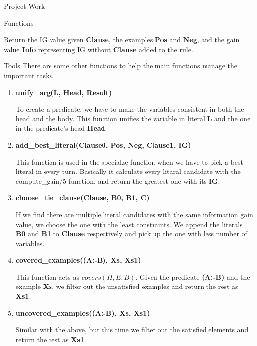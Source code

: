 \documentclass[12pt,a4paper]{article}
\begin{document}
\begin{section}{Project Work}
\begin{subsection}{Functions}
\begin{enumerate}
{					Return the IG value given {\bf Clause}, the examples {\bf Pos} and {\bf Neg}, and the gain value {\bf Info} representing IG without {\bf Clause} added to the rule.
				}
			\end{enumerate}
		\end{subsection}
		\begin{subsection}{Tools}
		There are some other functions to help the main functions manage the important tasks.
		\begin{enumerate}
			\item {
				{\bf unify\_arg(L, Head, Result)}

				To create a predicate, we have to make the variables consistent in both the head and the body. This function unifies the variable in literal {\bf L} and the one in the predicate's head {\bf Head}.
			}
			\item {
				{\bf add\_best\_literal(Clause0, Pos, Neg, Clause1, IG)}

				This function is used in the specialze function when we have to pick a best literal in every turn. Basically it calculate every litaral candidate with the compute\_gain/5 function, and return the greatest one with its {\bf IG}.
			}
			\item {
				{\bf choose\_tie\_clause(Clause, B0, B1, C)}

				If we find there are multiple literal candidates with the same information gain value, we choose the one with the least constraints. We append the literals {\bf B0} and {\bf B1} to {\bf Clause} respectively and pick up the one with less number of variables.
			}
			\item {
				{\bf covered\_examples((A:-B), Xs, Xs1)}

				This function acts as $covers(H,E,B)$. Given the predicate {\bf (A:-B)} and the example {\bf Xs}, we filter out the unsatisfied examples and return the rest as {\bf Xs1}.
			}
			\item {
				{\bf uncovered\_examples((A:-B), Xs, Xs1)}

				Similar with the above, but this time we filter out the satisfied elements and return the rest as {\bf Xs1}.
			}
		\end{enumerate}
		\end{subsection}
	\end{section}
\end{document}
